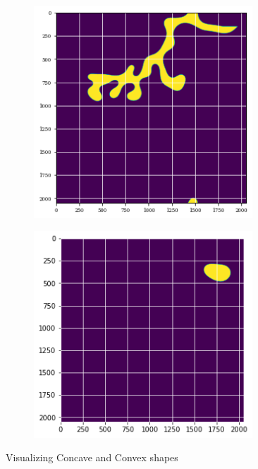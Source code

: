 \documentclass[12pt, a4paper]{report}
\begin{document}
\begin{figure}[H]
\centering
\begin{subfigure}{.45\textwidth}
  \centering
  \includegraphics[width=0.9\textwidth]{Pictures/MSFeatures/ExampleConcavePPT.png}
  \label{img:microstrImg}
\end{subfigure}
\begin{subfigure}{.45\textwidth}
  \centering
  \includegraphics[width=0.9\textwidth]{Pictures/MSFeatures/ExampleConvexPPT.png}
  
  \label{img:microstrImg}
\end{subfigure}
\caption{Visualizing Concave and Convex shapes}
\label{fig:test}
\end{figure}
\end{document}
